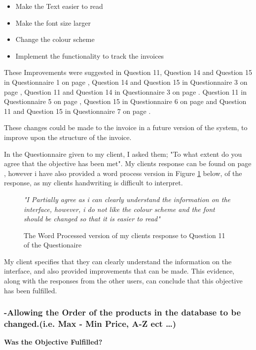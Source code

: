 \begin{itemize}
	\item{ Make the Text easier to read}
	\item{ Make the font size larger}
	\item{ Change the colour scheme}
	\item{Implement the functionality to track the invoices}
\end{itemize}

These Improvements were suggested in Question 11, Question 14 and Question 15 in Questionnaire 1 on page \pageref{Client-Q1}, Question 14 and Question 15 in Questionnaire 3 on page \pageref{Questionnaire3}, Question 11 and Question 14 in Questionnaire 3 on page \pageref{Questionnaire3}. Question 11  in Questionnaire 5 on page \pageref{Questionnaire5}, Question 15  in Questionnaire 6 on page \pageref{Questionnaire6} and Question 11 and Question 15 in Questionnaire 7 on page \pageref{Questionnaire7}.


These changes could be made to the invoice in a future version of the system, to improve upon the structure of the invoice.

In the Questionnaire given to my client, I asked them; "To what extent do you agree that the objective has been met". My clients response can be found on page \pageref{Client-Q11}, however i have also provided a word process version in Figure \ref{response1} below, of the response, as my clients handwriting is difficult to interpret.

 \begin{figure}[H]
\caption{The Word Processed version of my clients response to Question 11 of the Questionaire} \label{response1}

\vspace{3mm}
\textit{\large{"I Partially agree as i can clearly understand the information on the interface, however, i do not like the colour scheme and the font should be changed so that it is easier to read"}}
\end{figure}
\vspace{3mm}

My client specifies that they can clearly understand the information on the interface, and also provided improvements that can be made. This evidence, along with the responses from the other users, can conclude that this objective has been fulfilled.


\pagebreak
\subsubsection{-Allowing the Order of the products in the database to be changed.(i.e. Max - Min Price, A-Z ect \ldots)}
\textbf{Was the Objective Fulfilled?} \newline

